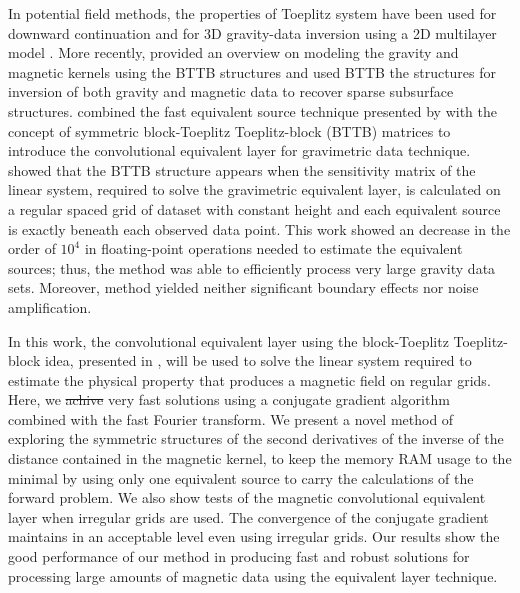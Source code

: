 \documentclass[manuscript]{geophysics}
\providecommand{\DIFaddtex}[1]{{\protect\color{blue}\uwave{#1}}} %
\providecommand{\DIFdeltex}[1]{{\protect\color{red}\sout{#1}}}                      %
\providecommand{\DIFaddbegin}{} %
\providecommand{\DIFaddend}{} %
\providecommand{\DIFdelbegin}{} %
\providecommand{\DIFdelend}{} %
\providecommand{\DIFadd}[1]{\texorpdfstring{\DIFaddtex{#1}}{#1}} %
\providecommand{\DIFdel}[1]{\texorpdfstring{\DIFdeltex{#1}}{}} %
\begin{document}
	In potential field methods, the properties of Toeplitz system have been used for downward continuation \citep{zhang-etal2016} and for 3D gravity-data inversion using a 2D multilayer model \citep{zhang-wong2015}. More recently, \cite{hogue2020tutorial} provided an overview on modeling the gravity and magnetic kernels using the BTTB structures and \cite{renaut2020fast} used BTTB the structures for inversion of both gravity and magnetic data to recover sparse subsurface structures.
	\cite{takahashi2020convolutional} combined the fast equivalent source technique presented by \cite{siqueira-etal2017} with the concept of symmetric block-Toeplitz Toeplitz-block (BTTB) matrices to introduce the convolutional equivalent layer for gravimetric data technique. 
	\cite{takahashi2020convolutional} showed that the BTTB structure appears when the sensitivity matrix of the linear system, required to solve the gravimetric equivalent layer, is calculated on a regular spaced grid of dataset with constant height and each equivalent source is exactly beneath each observed data point. 
	This work showed an decrease in the order of $10^4$ in floating-point operations needed to estimate the equivalent sources; thus, the \cite{takahashi2020convolutional} method was able to efficiently process very large gravity data sets. 
	Moreover, \cite{takahashi2020convolutional} method yielded neither significant boundary effects nor noise amplification.
	
	In this work, the convolutional equivalent layer using the block-Toeplitz Toeplitz-block idea, presented in \cite{takahashi2020convolutional}, will be used to solve the linear system required to estimate the physical property that produces a magnetic field on regular grids. 
	Here, we \DIFdelbegin \DIFdel{achive }\DIFdelend \DIFaddbegin \DIFadd{achieve }\DIFaddend very fast solutions using a conjugate gradient algorithm combined with the fast Fourier transform. We present a novel method of exploring the symmetric structures of the second derivatives of the inverse of the distance contained in the magnetic kernel, to keep the memory RAM usage to the minimal by using only one equivalent source to carry the calculations of the forward problem. We also show tests of the magnetic convolutional equivalent layer when irregular grids are used. The convergence of the conjugate gradient maintains in an acceptable level even using irregular grids. 
	Our results show the good performance of our method in producing fast and robust solutions for processing large amounts of magnetic data using the equivalent layer technique.
	
\end{document}
